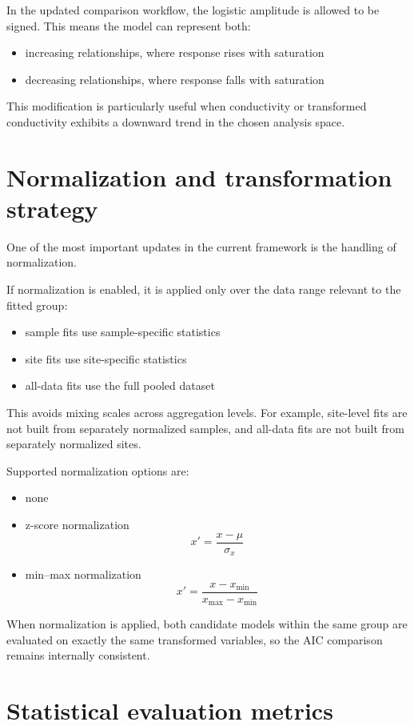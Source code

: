 \documentclass[11pt]{article}
\begin{document}
In the updated comparison workflow, the logistic amplitude is allowed to be signed. This means the model can represent both:
\begin{itemize}[leftmargin=1.5em]
\item increasing relationships, where response rises with saturation
\item decreasing relationships, where response falls with saturation
\end{itemize}

This modification is particularly useful when conductivity or transformed conductivity exhibits a downward trend in the chosen analysis space.

\section{Normalization and transformation strategy}

One of the most important updates in the current framework is the handling of normalization.

If normalization is enabled, it is applied only over the data range relevant to the fitted group:
\begin{itemize}[leftmargin=1.5em]
\item sample fits use sample-specific statistics
\item site fits use site-specific statistics
\item all-data fits use the full pooled dataset
\end{itemize}

This avoids mixing scales across aggregation levels. For example, site-level fits are not built from separately normalized samples, and all-data fits are not built from separately normalized sites.

Supported normalization options are:
\begin{itemize}[leftmargin=1.5em]
\item none
\item z-score normalization
\[
x' = \frac{x-\mu}{\sigma_x}
\]
\item min--max normalization
\[
x' = \frac{x-x_{\min}}{x_{\max}-x_{\min}}
\]
\end{itemize}

When normalization is applied, both candidate models within the same group are evaluated on exactly the same transformed variables, so the AIC comparison remains internally consistent.

\section{Statistical evaluation metrics}
\end{document}
